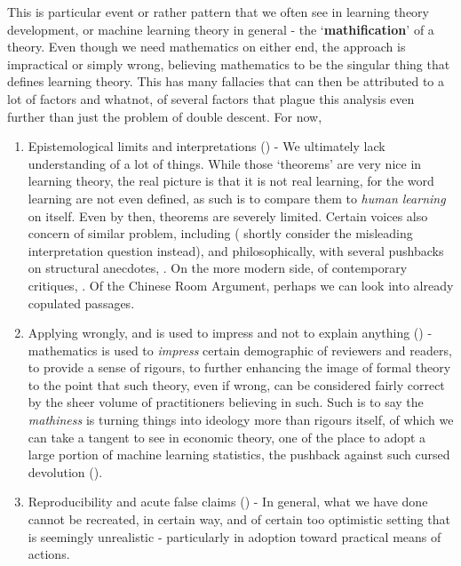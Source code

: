 \documentclass[10pt]{article}
\begin{document}
This is particular event or rather pattern that we often see in learning theory development, or machine learning theory in general - the `\textbf{mathification}' of a theory. Even though we need mathematics on either end, the approach is impractical or simply wrong, believing mathematics to be the singular thing that defines learning theory. This has many fallacies that can then be attributed to a lot of factors and whatnot, of several factors that plague this analysis even further than just the problem of double descent. For now, 
\begin{enumerate}[itemsep=2pt,topsep=1pt]
    \item Epistemological limits and interpretations (\cite{electronics13020416}) - We ultimately lack understanding of a lot of things. While those `theorems' are very nice in learning theory, the real picture is that it is not real learning, for the word learning are not even defined, as such is to compare them to \textit{human learning} on itself. Even by then, theorems are severely limited. Certain voices also concern of similar problem, including \cite{lipton2016mythos,doshi2017towards,molnar2020general} (\cite{molnar2020general} shortly consider the misleading interpretation question instead), and philosophically, with several pushbacks on structural anecdotes, \cite{dreyfus1965alchemy,dreyfus1972what,dreyfus1986mind,suchman1987plans,brooks1991intelligence,searle1980minds,mccarthy1969philosophical,harnad1990symbol}. On the more modern side, of contemporary critiques, \cite{pearl2009causality,marcus2018deep,sutton2019bitter}. Of the Chinese Room Argument, perhaps we can look into already copulated passages. 
    \item Applying wrongly, and is used to impress and not to explain anything (\cite{lipton2018troublingtrendsmachinelearning}) - mathematics is used to \textit{impress} certain demographic of reviewers and readers, to provide a sense of rigours, to further enhancing the image of formal theory to the point that such theory, even if wrong, can be considered fairly correct by the sheer volume of practitioners believing in such. Such is to say the \textit{mathiness} is turning things into ideology more than rigours itself, of which we can take a tangent to see in economic theory, one of the place to adopt a large portion of machine learning statistics, the pushback against such cursed devolution (\cite{romer2015mathiness,syll2024postreal}). 
    \item Reproducibility and acute false claims (\cite{kapoor2022leakage}) - In general, what we have done cannot be recreated, in certain way, and of certain too optimistic setting that is seemingly unrealistic - particularly in adoption toward practical means of actions. 
\end{enumerate}
\end{document}
